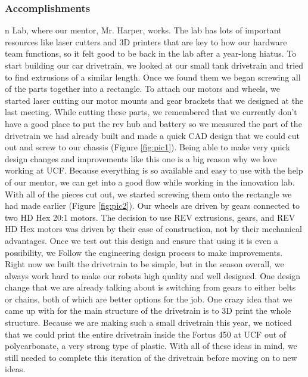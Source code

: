 \subsubsection*{Accomplishments}
n Lab, where our mentor, Mr. Harper, works. The lab has lots of important resources like laser cutters and 3D printers that are key to how our hardware team functions, so it felt good to be back in the lab after a year-long hiatus. To start building our car drivetrain, we looked at our small tank drivetrain and tried to find extrusions of a similar length. Once we found them we began screwing all of the parts together into a rectangle. To attach our motors and wheels, we started laser cutting our motor mounts and gear brackets that we designed at the last meeting. While cutting these parts, we remembered that we currently don’t have a good place to put the rev hub and battery so we measured the part of the drivetrain we had already built and made a quick CAD design that we could cut out and screw to our chassis (Figure \ref{fig:pic1}). Being able to make very quick design changes and improvements like this one is a big reason why we love working at UCF. Because everything is so available and easy to use with the help of our mentor, we can get into a good flow while working in the innovation lab. 
With all of the pieces cut out, we started screwing them onto the rectangle we had made earlier (Figure \ref{fig:pic2}). Our wheels are driven by gears connected to two HD Hex 20:1 motors. The decision to use REV extrusions, gears, and REV HD Hex motors was driven by their ease of construction, not by their mechanical advantages. Once we test out this design and ensure that using it is even a possibility, we Follow the engineering design process to make improvements. Right now we built the drivetrain to be simple, but in the season overall, we always work hard to make our robots high quality and well designed. One design change that we are already talking about is switching from gears to either belts or chains, both of which are better options for the job. One crazy idea that we came up with for the main structure of the drivetrain is to 3D print the whole structure. Because we are making such a small drivetrain this year, we noticed that we could print the entire drivetrain inside the Fortus 450 at UCF out of polycarbonate, a very strong type of plastic. With all of these ideas in mind, we still needed to complete this iteration of the drivetrain before moving on to new ideas. 


